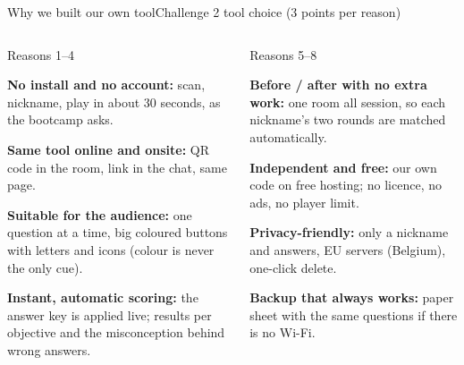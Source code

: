 \documentclass[aspectratio=169,11pt,t]{beamer}
\newcommand\explain[2]{%
  \begin{tcolorbox}[enhanced, colback=white, colframe=white, arc=2mm, boxrule=0pt, left=2.5mm, right=2.5mm, top=1.5mm, bottom=1.5mm,
      before skip=0pt, after skip=1.6mm, drop fuzzy shadow={black!30}, before upper=\raggedright]
    {\headfont\fontsize{8}{10}\selectfont\color{navy}#1\par}\vspace{.5mm}
    {\fontsize{7}{8.6}\selectfont #2\par}
  \end{tcolorbox}}
\newcommand\bul[2]{\par\noindent\makebox[3.5mm][l]{\textcolor{#1}{\tiny\faCircle}}\parbox[t]{\dimexpr\linewidth-3.5mm}{\raggedright #2}\par\vspace{.4mm}}
\begin{document}
\begin{frame}{Why we built our own tool}{Challenge 2 \textbullet{} tool choice (3 points per reason)}
  \vspace{1mm}
  \begin{columns}[T,onlytextwidth]
    \explain{Reasons 1--4}{%
      \bul{navy}{\textbf{No install and no account:} scan, nickname, play in about 30 seconds, as the bootcamp asks.}
      \bul{navy}{\textbf{Same tool online and onsite:} QR code in the room, link in the chat, same page.}
      \bul{navy}{\textbf{Suitable for the audience:} one question at a time, big coloured buttons with letters and icons (colour is never the only cue).}
      \bul{navy}{\textbf{Instant, automatic scoring:} the answer key is applied live; results per objective and the misconception behind wrong answers.}}
    \explain{Reasons 5--8}{%
      \bul{alert}{\textbf{Before / after with no extra work:} one room all session, so each nickname's two rounds are matched automatically.}
      \bul{alert}{\textbf{Independent and free:} our own code on free hosting; no licence, no ads, no player limit.}
      \bul{alert}{\textbf{Privacy-friendly:} only a nickname and answers, EU servers (Belgium), one-click delete.}
      \bul{alert}{\textbf{Backup that always works:} paper sheet with the same questions if there is no Wi-Fi.}}
  \end{columns}
\end{frame}
\end{document}
